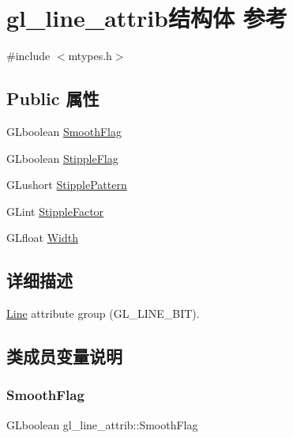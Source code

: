 \hypertarget{structgl__line__attrib}{}\section{gl\+\_\+line\+\_\+attrib结构体 参考}
\label{structgl__line__attrib}


{\ttfamily \#include $<$mtypes.\+h$>$}

\subsection*{Public 属性}
\begin{DoxyCompactItemize}
\item 
G\+Lboolean \hyperlink{structgl__line__attrib_aa99af290374763cc4071221f2b924f3b}{Smooth\+Flag}
\item 
G\+Lboolean \hyperlink{structgl__line__attrib_ad2ac7d86c7314a3a88c4a2b29ddf2f27}{Stipple\+Flag}
\item 
G\+Lushort \hyperlink{structgl__line__attrib_a930054b381115d34df02010a4efb9e65}{Stipple\+Pattern}
\item 
G\+Lint \hyperlink{structgl__line__attrib_a06ce34b685f070d817bcd62aee1c36f0}{Stipple\+Factor}
\item 
G\+Lfloat \hyperlink{structgl__line__attrib_a2c8132479e854d21c5b1c2d831d63191}{Width}
\end{DoxyCompactItemize}


\subsection{详细描述}
\hyperlink{struct_line}{Line} attribute group (G\+L\+\_\+\+L\+I\+N\+E\+\_\+\+B\+IT). 

\subsection{类成员变量说明}
\mbox{\label{structgl__line__attrib_aa99af290374763cc4071221f2b924f3b}} 
\subsubsection{\texorpdfstring{Smooth\+Flag}{SmoothFlag}}
{\footnotesize\ttfamily G\+Lboolean gl\+\_\+line\+\_\+attrib\+::\+Smooth\+Flag}

